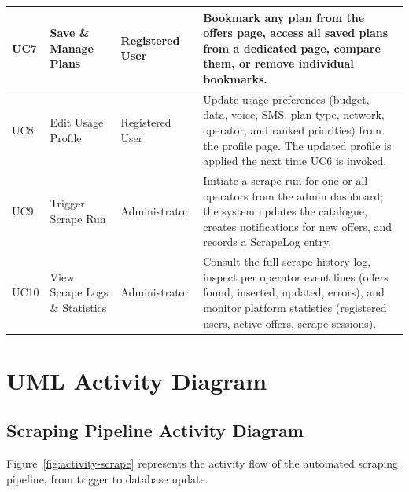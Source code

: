 {\begin{longtable}{|p{1.1cm}|p{3.8cm}|p{2.8cm}|p{6.0cm}|}
    UC7 & Save \& Manage Plans        & Registered User   & Bookmark any plan from the offers page, access all saved plans from a dedicated page, compare them, or remove individual bookmarks. \\
    \hline
    UC8 & Edit Usage Profile          & Registered User   & Update usage preferences (budget, data, voice, SMS, plan type, network, operator, and ranked priorities) from the profile page. The updated profile is applied the next time UC6 is invoked. \\
    \hline
    UC9 & Trigger Scrape Run          & Administrator     & Initiate a scrape run for one or all operators from the admin dashboard; the system updates the catalogue, creates notifications for new offers, and records a ScrapeLog entry. \\
    \hline
    UC10 & View Scrape Logs \& Statistics & Administrator & Consult the full scrape history log, inspect per operator event lines (offers found, inserted, updated, errors), and monitor platform statistics (registered users, active offers, scrape sessions). \\
    \hline
\end{longtable}
}

\section{UML Activity Diagram}

\subsection{Scraping Pipeline Activity Diagram}

Figure~\ref{fig:activity-scrape} represents the activity flow of the automated scraping pipeline, from trigger to database update.

